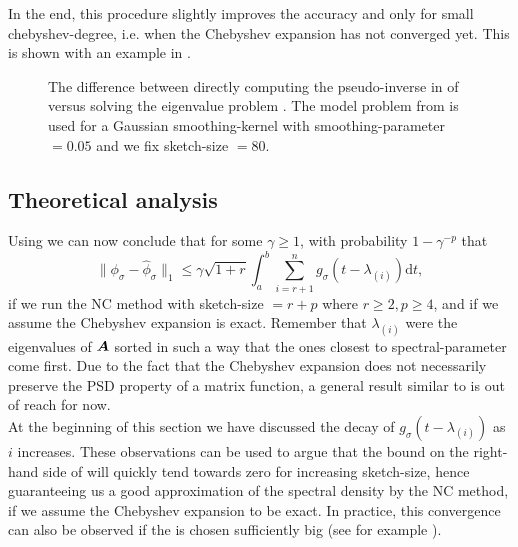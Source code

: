 In the end, this procedure slightly improves the accuracy
and only for small \gls{chebyshev-degree}, i.e. when the Chebyshev expansion has
not converged yet. This is shown with an example in .

\begin{figure}[ht]
    \centering
    
    \caption{The difference between directly computing the pseudo-inverse
        in  of 
        versus solving the eigenvalue problem .
        The model problem from 
        is used for a Gaussian \gls{smoothing-kernel} with \gls{smoothing-parameter} $=0.05$
        and we fix \gls{sketch-size} $=80$.}
    \label{fig:3-nystrom-eigenvalue-problem}
\end{figure}



\subsection{Theoretical analysis}
\label{subsec:3-nystrom-theoretical-analysis}

Using  we can now conclude that for some $\gamma \geq 1$, with probability $1-\gamma^{-p}$ that
\begin{equation}
    \lVert \phi_{\sigma} - \widehat{\phi}_{\sigma} \rVert _1 \leq \gamma\sqrt{1+r} \int_{a}^{b} \sum_{i=r+1}^{n} g_{\sigma}(t - \lambda_{(i)}) \mathrm{d}t,
    \label{equ:3-nystrom-spectral-density-error}
\end{equation}
if we run the \gls{NC} method with \gls{sketch-size} $= r + p$ where $r \geq 2, p \geq 4$,
and if we assume the Chebyshev expansion is exact. Remember that $\lambda_{(i)}$
were the eigenvalues of $\boldsymbol{A}$ sorted in such a way that the ones closest to
\gls{spectral-parameter} come first. Due to the fact that the Chebyshev
expansion does not necessarily preserve the \gls{PSD} property of a matrix function,
a general result similar to  is out of reach for now.\\

At the beginning of this section we have discussed the decay of $g_{\sigma}(t - \lambda_{(i)})$
as $i$ increases. These observations can be used to argue that the bound
on the right-hand side of 
will quickly tend towards zero for increasing \gls{sketch-size}, hence guaranteeing us a good approximation of
the spectral density by the \gls{NC} method, if we assume the Chebyshev expansion
to be exact. In practice, this convergence can also be observed if
the  is chosen sufficiently big
(see for example ).

